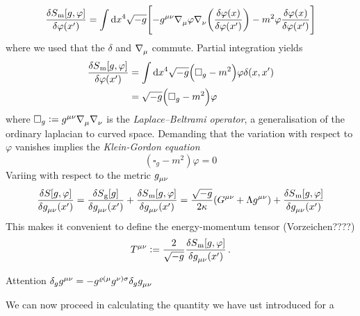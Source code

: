 \begin{equation}
\frac{\delta S\textsubscript{m}[g,\varphi]}{\delta \varphi\left(x'\right)}=\int
\dif x^4\sqrt{-g}\left[-\tensor{g}{^\mu^\nu}
\tensor{\nabla}{_\mu}\varphi\tensor{\nabla}{_\nu}\left(\frac{\delta
\varphi(x)}{\delta \varphi\left(x'\right)}\right)-m^2\varphi\frac{\delta
\varphi(x)}{\delta \varphi\left(x'\right)}\right]
\end{equation}
where we used that the $\delta$ and $\tensor{\nabla}{_\mu}$ commute. Partial
integration yields
\begin{equation}
\begin{split}
\frac{\delta S\textsubscript{m}[g,\varphi]}{\delta \varphi\left(x'\right)}&=\int
\dif
x^4\sqrt{-g}\left(\square_{g}-m^2\right)\varphi\delta(x,x')\\
&=\sqrt{-g}\left(\square_{g}-m^2\right)\varphi
\end{split}
\end{equation}
where $\square_{g}:=\tensor{g}{^\mu^\nu}
\tensor{\nabla}{_\mu}\tensor{\nabla}{_\nu} $ is the
\emph{Laplace–Beltrami operator}, a generalisation of the ordinary laplacian to
curved space.
Demanding that the variation with respect to $\varphi$ vanishes implies the
\emph{Klein-Gordon equation}
\begin{equation}
\left(\square_g-m^2\right)\varphi=0
\end{equation}
Variing with respect to the metric $\tensor{g}{_\mu_\nu}$
\begin{equation}
\frac{\delta S[g,\varphi]}{\delta
\tensor{g}{_\mu_\nu}\left(x'\right)}=
\frac{\delta S\textsubscript{g}[g]}{\delta
\tensor{g}{_\mu_\nu}\left(x'\right)}
+\frac{\delta S\textsubscript{m}[g,\varphi]}{\delta
\tensor{g}{_\mu_\nu}\left(x'\right)}
=\frac{\sqrt{-g}}{2\kappa}\left(\tensor{G}{^\mu^\nu}+\Lambda\tensor{g}{^\mu^\nu}
\right)+\frac{\delta S\textsubscript{m}[g,\varphi]}{\delta
\tensor{g}{_\mu_\nu}\left(x'\right)}
\end{equation}
This makes it convenient to define the energy-momentum tensor (Vorzeichen????)
\begin{equation}
\tensor{T}{^\mu^\nu}:=\frac{2}{\sqrt{-g}}\frac{\delta
S\textsubscript{m}[g,\varphi]}{\delta \tensor{g}{_\mu_\nu}\left(x'\right)}\,.
\end{equation}
\begin{remark}
Attention $\delta_g
\tensor{g}{^\mu^\nu}=-\tensor{g}{^\varrho^{(\mu}}\tensor{g}{^{\nu)}^\sigma}\delta_g
\tensor{g}{_\mu_\nu}$
\end{remark}
We can now proceed in calculating the quantity we have ust introduced for a
